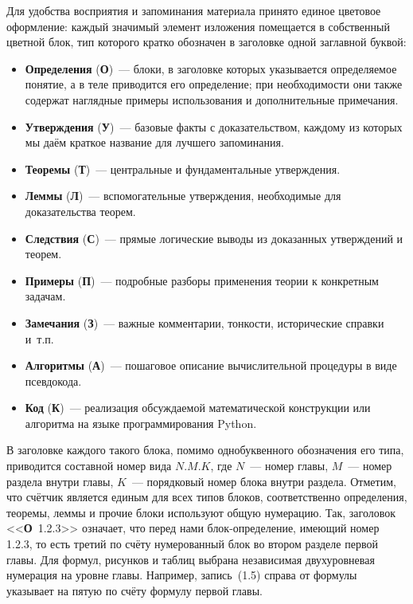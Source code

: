 Для удобства восприятия и запоминания материала принято единое цветовое оформление: каждый значимый элемент изложения помещается в собственный цветной блок, тип которого кратко обозначен в заголовке одной заглавной буквой:
\begin{itemize}
    \item \textbf{\textcolor{deficolor}{Определения}}
        (\textbf{\textcolor{deficolor}{О}})~---
        блоки, в заголовке которых указывается определяемое понятие, а в теле приводится его определение; при необходимости они также содержат наглядные примеры использования и дополнительные примечания.
    \item \textbf{\textcolor{statcolor}{Утверждения}}
        (\textbf{\textcolor{statcolor}{У}})~---
        базовые факты с доказательством, каждому из которых мы даём краткое название для лучшего запоминания.
    \item \textbf{\textcolor{theocolor}{Теоремы}}
        (\textbf{\textcolor{theocolor}{Т}})~---
        центральные и фундаментальные утверждения.
    \item \textbf{\textcolor{lemmcolor}{Леммы}}
        (\textbf{\textcolor{lemmcolor}{Л}})~---
        вспомогательные утверждения, необходимые для доказательства теорем.
    \item \textbf{\textcolor{conccolor}{Следствия}}
        (\textbf{\textcolor{conccolor}{С}})~---
        прямые логические выводы из доказанных утверждений и теорем.
    \item \textbf{\textcolor{examcolor}{Примеры}}
        (\textbf{\textcolor{examcolor}{П}})~---
        подробные разборы применения теории к конкретным задачам.
    \item \textbf{\textcolor{notecolor}{Замечания}}
        (\textbf{\textcolor{notecolor}{З}})~---
        важные комментарии, тонкости, исторические справки и~т.п.
    \item \textbf{\textcolor{algocolor}{Алгоритмы}}
        (\textbf{\textcolor{algocolor}{А}})~---
        пошаговое описание вычислительной процедуры в виде псевдокода.
    \item \textbf{\textcolor{codecolor}{Код}}
        (\textbf{\textcolor{codecolor}{К}})~---
        реализация обсуждаемой математической конструкции или алгоритма на языке программирования Python.
\end{itemize}
В заголовке каждого такого блока, помимо однобуквенного обозначения его типа, приводится составной номер вида $N.M.K$, где $N$~--- номер главы, $M$~--- номер раздела внутри главы, $K$~--- порядковый номер блока внутри раздела.
Отметим, что счётчик является единым для всех типов блоков, соответственно определения, теоремы, леммы и прочие блоки используют общую нумерацию.
Так, заголовок <<\textbf{\textcolor{deficolor}{О}}~1.2.3>> означает, что перед нами блок-определение, имеющий номер 1.2.3, то есть третий по счёту нумерованный блок во втором разделе первой главы.
Для формул, рисунков и таблиц выбрана независимая двухуровневая нумерация на уровне главы.
Например, запись~(1.5) справа от формулы указывает на пятую по счёту формулу первой главы.

